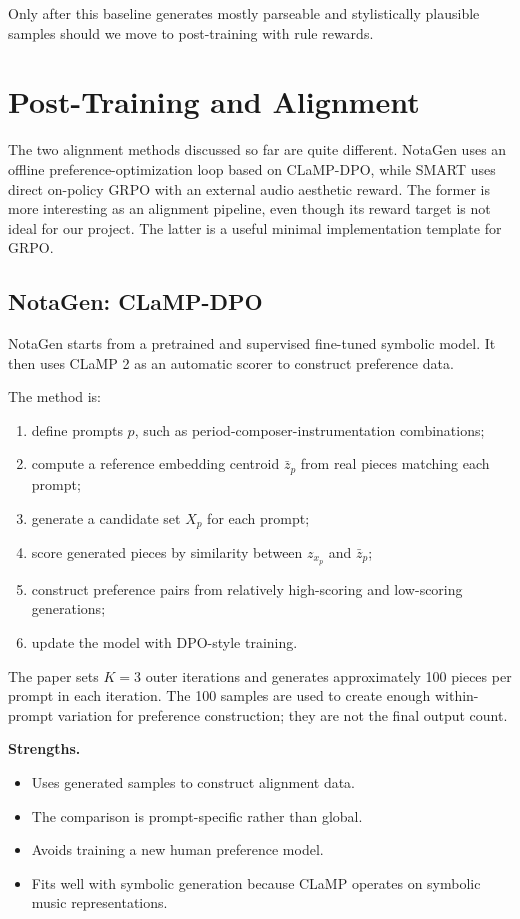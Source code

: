 \documentclass[11pt]{article}
\begin{document}
Only after this baseline generates mostly parseable and stylistically plausible
samples should we move to post-training with rule rewards.

\section{Post-Training and Alignment}
\label{sec:alignment}

The two alignment methods discussed so far are quite different. NotaGen uses an
offline preference-optimization loop based on CLaMP-DPO, while SMART uses direct
on-policy GRPO with an external audio aesthetic reward. The former is more
interesting as an alignment pipeline, even though its reward target is not ideal
for our project. The latter is a useful minimal implementation template for GRPO.

\subsection{NotaGen: CLaMP-DPO}

NotaGen starts from a pretrained and supervised fine-tuned symbolic model. It
then uses CLaMP 2 as an automatic scorer to construct preference data.

The method is:

\begin{enumerate}[leftmargin=*]
  \item define prompts \(p\), such as period-composer-instrumentation
  combinations;
  \item compute a reference embedding centroid \(\bar{z}_p\) from real pieces
  matching each prompt;
  \item generate a candidate set \(X_p\) for each prompt;
  \item score generated pieces by similarity between \(z_{x_p}\) and
  \(\bar{z}_p\);
  \item construct preference pairs from relatively high-scoring and low-scoring
  generations;
  \item update the model with DPO-style training.
\end{enumerate}

The paper sets \(K=3\) outer iterations and generates approximately 100 pieces
per prompt in each iteration. The 100 samples are used to create enough
within-prompt variation for preference construction; they are not the final
output count.

\textbf{Strengths.}
\begin{itemize}[leftmargin=*]
  \item Uses generated samples to construct alignment data.
  \item The comparison is prompt-specific rather than global.
  \item Avoids training a new human preference model.
  \item Fits well with symbolic generation because CLaMP operates on symbolic
  music representations.
\end{itemize}
\end{document}
